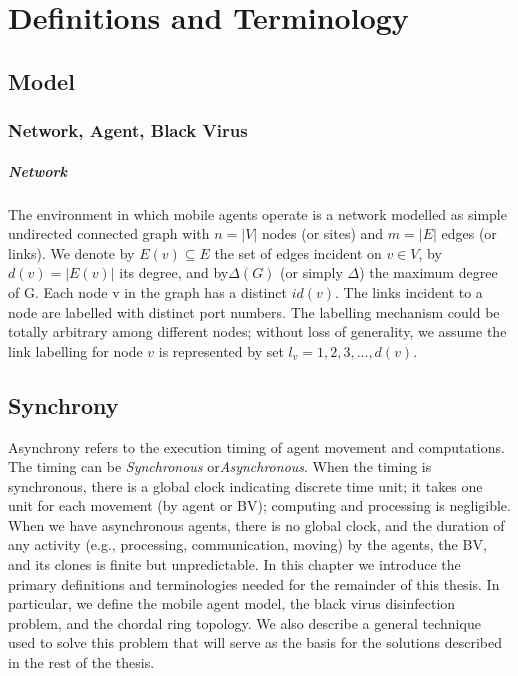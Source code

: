 \chapter {Definitions and Terminology}
\label{PM}
\section{Model}
\subsection{Network, Agent, Black Virus}
\paragraph{Network} The environment in which mobile agents operate is a network modelled as simple undirected connected graph with $n = \left |V\right |$ nodes (or sites) and $m = \left |E\right |$ edges (or links). We denote by $E (v)\subseteq E$ the set of edges incident on $v\in V$, by $d (v) = \left|E (v)\right|$ its degree, and by$\Delta(G)$ (or simply $\Delta$) the maximum degree of G. Each node v in the graph has a distinct $id(v)$. The links incident to a node are labelled with distinct port numbers. The labelling mechanism could be totally arbitrary among different nodes; without loss of generality, we assume the link labelling for node $v$ is represented by set $l_v =1,2,3,...,d(v)$.

\section{Synchrony}
Asynchrony refers to the execution timing of agent movement and computations. The timing can be {\em Synchronous} or{\em Asynchronous}. When the timing is synchronous, there is a global clock indicating discrete time unit; it takes one unit for each movement (by agent or BV); computing and processing is negligible.
When we have asynchronous agents, there is no global clock, and the duration of any activity (e.g., processing, communication, moving) by the agents, the BV, and its clones is finite but unpredictable.
In this chapter we  introduce the primary definitions and terminologies needed for the remainder of this thesis.
In particular, we define the mobile agent model, the black virus  disinfection problem,  and the chordal ring topology. We also describe a general technique used to solve this problem that will serve as the basis for the solutions described in the rest of the thesis.

